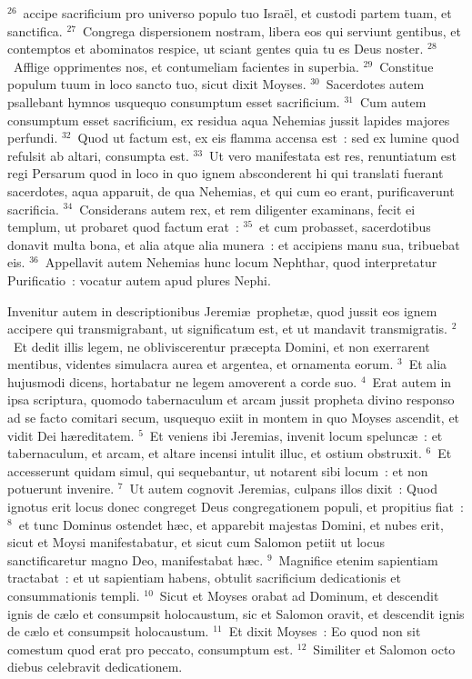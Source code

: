 ${}^{26}$~accipe sacrificium pro universo populo tuo Isra\"el, et custodi partem tuam, et sanctifica.
${}^{27}$~Congrega dispersionem nostram, libera eos qui serviunt gentibus, et contemptos et abominatos respice, ut sciant gentes quia tu es Deus noster.
${}^{28}$~Afflige opprimentes nos, et contumeliam facientes in superbia.
${}^{29}$~Constitue populum tuum in loco sancto tuo, sicut dixit Moyses.
${}^{30}$~Sacerdotes autem psallebant hymnos usquequo consumptum esset sacrificium.
${}^{31}$~Cum autem consumptum esset sacrificium, ex residua aqua Nehemias jussit lapides majores perfundi.
${}^{32}$~Quod ut factum est, ex eis flamma accensa est~: sed ex lumine quod refulsit ab altari, consumpta est.
${}^{33}$~Ut vero manifestata est res, renuntiatum est regi Persarum quod in loco in quo ignem absconderent hi qui translati fuerant sacerdotes, aqua apparuit, de qua Nehemias, et qui cum eo erant, purificaverunt sacrificia.
${}^{34}$~Considerans autem rex, et rem diligenter examinans, fecit ei templum, ut probaret quod factum erat~:
${}^{35}$~et cum probasset, sacerdotibus donavit multa bona, et alia atque alia munera~: et accipiens manu sua, tribuebat eis.
${}^{36}$~Appellavit autem Nehemias hunc locum Nephthar, quod interpretatur Purificatio~: vocatur autem apud plures Nephi.

\lettrine[lines=3,image=true,loversize=0.05,lraise=-0.03]{I}{}nvenitur autem in descriptionibus Jeremi\ae\ prophet\ae , quod jussit eos ignem accipere qui transmigrabant, ut significatum est, et ut mandavit transmigratis.
${}^{2}$~Et dedit illis legem, ne obliviscerentur pr\ae cepta Domini, et non exerrarent mentibus, videntes simulacra aurea et argentea, et ornamenta eorum.
${}^{3}$~Et alia hujusmodi dicens, hortabatur ne legem amoverent a corde suo.
${}^{4}$~Erat autem in ipsa scriptura, quomodo tabernaculum et arcam jussit propheta divino responso ad se facto comitari secum, usquequo exiit in montem in quo Moyses ascendit, et vidit Dei h\ae reditatem.
${}^{5}$~Et veniens ibi Jeremias, invenit locum spelunc\ae~: et tabernaculum, et arcam, et altare incensi intulit illuc, et ostium obstruxit.
${}^{6}$~Et accesserunt quidam simul, qui sequebantur, ut notarent sibi locum~: et non potuerunt invenire.
${}^{7}$~Ut autem cognovit Jeremias, culpans illos dixit~: Quod ignotus erit locus donec congreget Deus congregationem populi, et propitius fiat~:
${}^{8}$~et tunc Dominus ostendet h\ae c, et apparebit majestas Domini, et nubes erit, sicut et Moysi manifestabatur, et sicut cum Salomon petiit ut locus sanctificaretur magno Deo, manifestabat h\ae c.
${}^{9}$~Magnifice etenim sapientiam tractabat~: et ut sapientiam habens, obtulit sacrificium dedicationis et consummationis templi.
${}^{10}$~Sicut et Moyses orabat ad Dominum, et descendit ignis de c\ae lo et consumpsit holocaustum, sic et Salomon oravit, et descendit ignis de c\ae lo et consumpsit holocaustum.
${}^{11}$~Et dixit Moyses~: Eo quod non sit comestum quod erat pro peccato, consumptum est.
${}^{12}$~Similiter et Salomon octo diebus celebravit dedicationem.


